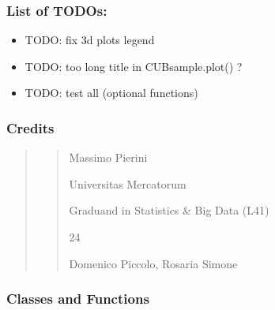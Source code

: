 \documentclass[letterpaper,10pt,english]{sphinxmanual}
\begin{document}
\subsubsection{List of TODOs:}
\label{\detokenize{cubmods:id373}}\begin{itemize}
\item {} 
\sphinxAtStartPar
TODO: fix 3d plots legend

\item {} 
\sphinxAtStartPar
TODO: too long title in CUBsample.plot() ?

\item {} 
\sphinxAtStartPar
TODO: test all  (optional functions)

\end{itemize}


\subsubsection{Credits}
\label{\detokenize{cubmods:id374}}\begin{quote}
\begin{quote}\begin{description}
\sphinxAtStartPar
Massimo Pierini

\sphinxAtStartPar
Universitas Mercatorum

\sphinxAtStartPar
Graduand in Statistics \& Big Data (L41)

\sphinxhyphen{}24

\sphinxAtStartPar
Domenico Piccolo, Rosaria Simone

\sphinxAtStartPar
{}

\end{description}\end{quote}
\end{quote}


\subsubsection{Classes and Functions}
\label{\detokenize{cubmods:id375}}
\end{document}
